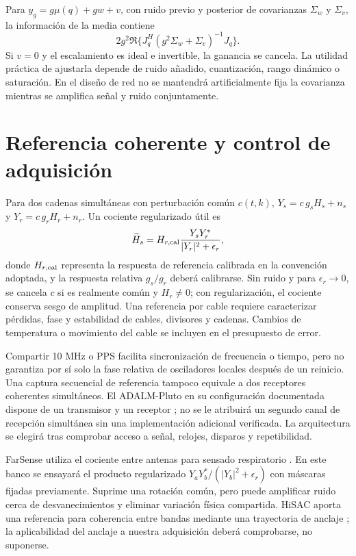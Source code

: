 Para $y_g=g\mu(q)+gw+v$, con ruido previo y posterior de covarianzas
$\Sigma_w$ y $\Sigma_v$, la información de la media contiene
\begin{equation}
2g^2\Re\{J_q^H(g^2\Sigma_w+\Sigma_v)^{-1}J_q\}.
\end{equation}
Si $v=0$ y el escalamiento es ideal e invertible, la ganancia se cancela.
La utilidad práctica de ajustarla depende de ruido añadido, cuantización,
rango dinámico o saturación. En el diseño de red no se mantendrá artificialmente
fija la covarianza mientras se amplifica señal y ruido conjuntamente.

\section{Referencia coherente y control de adquisición}
\label{sec:coherent_acquisition}

Para dos cadenas simultáneas con perturbación común $c(t,k)$,
$Y_s=c\,g_sH_s+n_s$ y $Y_r=c\,g_rH_r+n_r$. Un cociente regularizado útil es
\begin{equation}
\widetilde H_s=H_{r,\rm cal}\frac{Y_sY_r^{*}}{|Y_r|^2+\epsilon_r},
\label{eq:cabled_reference_ratio}
\end{equation}
donde $H_{r,\rm cal}$ representa la respuesta de referencia calibrada en la convención
adoptada, y la respuesta relativa $g_s/g_r$ deberá calibrarse. Sin ruido y para
$\epsilon_r\to0$, se cancela $c$ si es realmente común y $H_r\ne0$; con
regularización, el cociente conserva sesgo de amplitud. Una referencia por cable
requiere caracterizar pérdidas, fase y estabilidad de cables, divisores y cadenas.
Cambios de temperatura o movimiento del cable se incluyen en el presupuesto de error.

Compartir 10 MHz o PPS facilita sincronización de frecuencia o tiempo, pero no
garantiza por sí solo la fase relativa de osciladores locales después de un reinicio.
Una captura secuencial de referencia tampoco equivale a dos receptores coherentes
simultáneos. El ADALM-Pluto en su configuración documentada dispone de un transmisor
y un receptor \citep{AnalogDevicesPluto}; no se le atribuirá un segundo canal de
recepción simultánea sin una implementación adicional verificada. La arquitectura
se elegirá tras comprobar acceso a señal, relojes, disparos y repetibilidad.

FarSense utiliza el cociente entre antenas para sensado respiratorio
\citep{Zeng2019FarSense}. En este banco se ensayará el producto regularizado
$Y_aY_b^*/(|Y_b|^2+\epsilon_r)$ con máscaras fijadas previamente. Suprime una
rotación común, pero puede amplificar ruido cerca de desvanecimientos y eliminar
variación física compartida. HiSAC aporta una referencia para coherencia entre bandas
mediante una trayectoria de anclaje \citep{Pegoraro2024HiSAC}; la aplicabilidad del
anclaje a nuestra adquisición deberá comprobarse, no suponerse.

